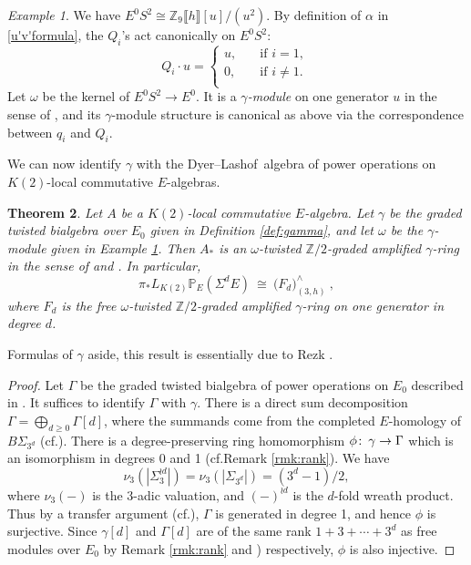\documentclass{gtpart}
\newtheorem{thm}{Theorem}
\theoremstyle{definition}
\theoremstyle{remark}
\newtheorem{exam}[thm]{Example}
\def\co{\colon\thinspace}
\newcommand{\mb}[1]{\mathbb{#1}}
\newcommand{\cf}{cf.\thinspace}
\newcommand{\DL}{Dyer--Lashof~}
\newcommand{\BP}{{\mb P}}
\newcommand{\BZ}{{\mb Z}}
\newcommand{\A}{\alpha}
\newcommand{\G}{\Gamma}
\newcommand{\g}{\gamma}
\begin{document}
\begin{exam}
\label{ex:omega}
 We have $E^0 S^2 \cong \BZ_9 \llbracket h \rrbracket [u] / (u^2)$.  
 By definition of $\A$ in \eqref{u'v'formula}, the $Q_i$'s act canonically on $E^0 S^2$: 
 \[
  Q_i \cdot u = \left\{
  \begin{array}{ll}
    u,  & \quad \text{if $i = 1$, } \\
    0,  & \quad \text{if $i \neq 1$.  } \\
  \end{array}
  \right.
 \]
 Let $\omega$ be the kernel of $E^0 S^2 \to E^0$.  
 It is a {\em $\g$-module} on one generator $u$ in the sense of \cite[2.2]{h2p2}, and its $\g$-module structure is canonical as above via the correspondence between $q_i$ and $Q_i$.  
\end{exam}

We can now identify $\g$ with the \DL algebra of power operations on $K(2)$-local commutative $E$-algebras.  

\begin{thm}
\label{thm:gamma}
 Let $A$ be a $K(2)$-local commutative $E$-algebra.  
 Let $\g$ be the graded twisted bialgebra over $E_0$ given in Definition \ref{def:gamma}, and let $\omega$ be the $\g$-module given in Example \ref{ex:omega}.  
 Then $A_*$ is an {\em $\omega$-twisted $\BZ/2$-graded amplified $\g$-ring} in the sense of \cite[Section 2]{cong} and \cite[2.5 and 2.6]{h2p2}.  In particular, 
 \[
  \pi_* L_{K(2)} \BP_E (\Sigma^d E) ~ \cong ~ \big( F_d \big)_{(3,h)}^\wedge ~ , 
 \]
 where $F_d$ is the free $\omega$-twisted $\BZ/2$-graded amplified $\g$-ring on one generator in degree $d$.  
\end{thm}
Formulas of $\g$ aside, this result is essentially due to Rezk \cite{cong, h2p2}.  
\begin{proof}
 Let $\G$ be the graded twisted bialgebra of power operations on $E_0$ described in \cite[Section 6]{cong}.  
 It suffices to identify $\G$ with $\g$.  
 There is a direct sum decomposition $\G = \bigoplus_{d \geq 0} \G[d]$, where the summands come from the completed $E$-homology of $B\Sigma_{3^d}$ (\cf \cite[6.2]{cong}).  
 There is a degree-preserving ring homomorphism $\phi \co \g \to \G$ which is an isomorphism in degrees 0 and 1 (\cf Remark \ref{rmk:rank}).  
 We have 
 \[
  \nu_3(|\Sigma_3^{\wr d}|) = \nu_3(|\Sigma_{3^d}|) = (3^d - 1) / 2, 
 \]
 where $\nu_3(-)$ is the 3-adic valuation, and $(-)^{\wr d}$ is the $d$-fold wreath product.  
 Thus by a transfer argument (\cf \cite[Propositions 10.5 and 10.9]{lpo}), $\G$ is generated in degree 1, and hence $\phi$ is surjective.  
 Since $\g[d]$ and $\G[d]$ are of the same rank $1 + 3 + \cdots + 3^d$ as free modules over $E_0$ by Remark \ref{rmk:rank} and \cite[Theorem 1.1]{Str98}) respectively, 
 $\phi$ is also injective.  
\end{proof}
\end{document}
